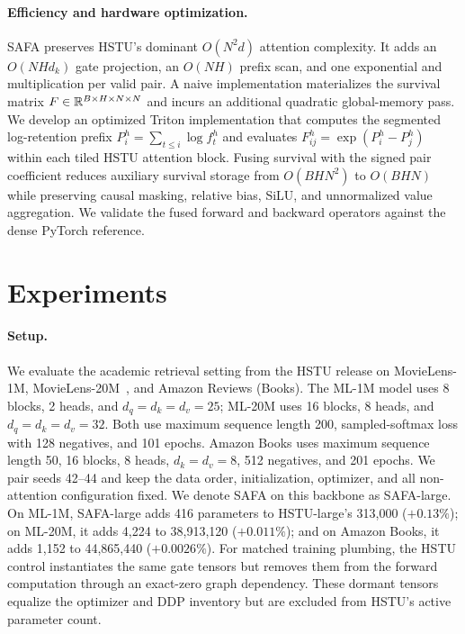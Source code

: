 \documentclass[11pt,letterpaper,logo]{yalearxiv}
\begin{document}
\paragraph{Efficiency and hardware optimization.}
SAFA preserves HSTU's dominant $O(N^2d)$ attention complexity.  It adds an
$O(NHd_k)$ gate projection, an $O(NH)$ prefix scan, and one exponential and
multiplication per valid pair.  A naive implementation materializes the
survival matrix $F\in\mathbb{R}^{B\times H\times N\times N}$ and incurs an additional
quadratic global-memory pass.  We develop an optimized Triton implementation
that computes the segmented log-retention prefix
$P_i^h=\sum_{t\leq i}\log f_t^h$ and evaluates
$F_{ij}^h=\exp(P_i^h-P_j^h)$ within each tiled HSTU attention block.  Fusing
survival with the signed pair coefficient reduces auxiliary survival storage
from $O(BHN^2)$ to $O(BHN)$ while preserving causal masking, relative bias,
SiLU, and unnormalized value aggregation.  We validate the fused forward and
backward operators against the dense PyTorch reference.


\section{Experiments}
\label{sec:experiments}

\paragraph{Setup.}
We evaluate the academic retrieval setting from the HSTU release on
MovieLens-1M, MovieLens-20M~\citep{harper2015movielens}, and Amazon Reviews
(Books).  The ML-1M model uses 8 blocks, 2 heads, and
$d_q=d_k=d_v=25$; ML-20M uses 16 blocks, 8 heads, and
$d_q=d_k=d_v=32$.  Both use maximum sequence length 200, sampled-softmax loss
with 128 negatives, and 101 epochs.  Amazon Books uses maximum sequence length
50, 16 blocks, 8 heads, $d_k=d_v=8$, 512 negatives, and 201 epochs.  We pair
seeds 42--44 and keep the data order, initialization, optimizer, and all
non-attention configuration fixed.  We denote SAFA on this backbone as
SAFA-large.  On ML-1M, SAFA-large adds 416 parameters to HSTU-large's 313,000
($+0.13\%$); on ML-20M, it adds 4,224 to 38,913,120 ($+0.011\%$); and on
Amazon Books, it adds 1,152 to 44,865,440 ($+0.0026\%$).
For matched training plumbing, the HSTU control instantiates the same gate
tensors but removes them from the forward computation through an exact-zero
graph dependency.  These dormant tensors equalize the optimizer and DDP
inventory but are excluded from HSTU's active parameter count.
\end{document}
